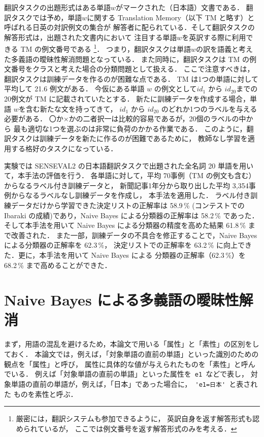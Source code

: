 翻訳タスクの出題形式はある単語\( w \)がマークされた（日本語）文書である．
翻訳タスクでは予め，単語\( w \)に関する Translation Memory（以下 TM と略す）と
呼ばれる日英の対訳例文の集合が
解答者に配られている．そして翻訳タスクの解答形式は，出題された文書内において
注目する単語\( w \)を英訳する際に利用できる TM の例文番号である
\footnote{厳密には，翻訳システムも参加できるように，
英訳自身を返す解答形式も認められているが，
ここでは例文番号を返す解答形式のみを考える．}．
つまり，翻訳タスクは単語\( w \)の訳を語義と考えた多義語の曖昧性解消問題となっている．
また同時に，翻訳タスクは TM の例文番号をクラスと考えた場合の分類問題として扱える．
ここで注意すべきは，翻訳タスクは訓練データを作るのが困難な点である．
TM は1つの単語に対して平均して 21.6 例文がある．
今仮にある単語 \( w \) の例文として\( id_1 \) から \( id_{20} \)までの20例文が 
TM に記載されていたとする．
新たに訓練データを作成する場合，単語 \( w \)を含む新たな文を持ってきて，
\( id_1 \) から \( id_{20} \) のどれか1つのラベルを与える必要がある．
〇か×かの二者択一は比較的容易であるが，20個のラベルの中から
最も適切な1つを選ぶのは非常に負荷のかかる作業である．
このように，翻訳タスクは訓練データを新たに作るのが困難であるために，
教師なし学習を適用する格好のタスクになっている．

実験では SENSEVAL2 の日本語翻訳タスクで出題された全名詞 20 単語を用いて，本手法の評価を行う．
各単語に対して，平均 70事例（TM の例文も含む）からなるラベル付き訓練データと，
新聞記事1年分から取り出した平均 3,354事例からなるラベルなし訓練データを作成し，
本手法を適用した．
ラベル付き訓練データだけから学習できた決定リストの正解率は
58.9\,\% (コンテストでの Ibaraki の成績)であり，Naive Bayes による分類器の正解率は 58.2\,\% であった．
そして本手法を用いて Naive Bayes による分類器の精度を高めた結果 61.8\,\% まで改善された．
また一部，訓練データの不具合を修正することで，Naive Bayes による分類器の正解率を 62.3\,\%，
決定リストでの正解率を 63.2\,\% に向上できた．更に，本手法を用いて Naive Bayes による
分類器の正解率（62.3\,\%）を 68.2\,\% まで高めることができた．


\section{Naive Bayes による多義語の曖昧性解消}


まず，用語の混乱を避けるため，本論文で用いる「属性」と「素性」の区別をしておく．
本論文では，例えば，「対象単語の直前の単語」といった識別のための観点を「属性」と呼び，
属性に具体的な値が与えられたものを「素性」と呼んでいる．
例えば「対象単語の直前の単語」といった属性を\verb| e1 |などで表し，
対象単語の直前の単語が，例えば，「日本」であった場合に，\verb| 'e1=日本' |と表された
ものを素性と呼ぶ．

